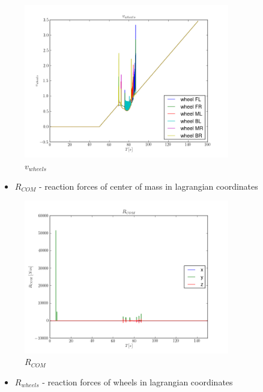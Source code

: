 \begin{figure}[H]
  \centering
    \includegraphics[width=0.8\textwidth]{vWHEELS6}
  \caption{$v_{wheels}$}
\end{figure}

\begin{itemize}
  \item $R_{COM}$ - reaction forces of center of mass in lagrangian coordinates
\end{itemize}

\begin{figure}[H]
  \centering
    \includegraphics[width=0.8\textwidth]{pCOM6}
  \caption{$R_{COM}$}
\end{figure}

\begin{itemize}
  \item $R_{wheels}$ - reaction forces of wheels in lagrangian coordinates
\end{itemize}

